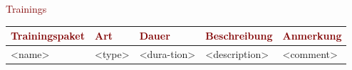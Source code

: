 \begin{center}
\textcolor{Maroon}{\Large Trainings}

{\fontsize{8}{10}\selectfont
\begin{tabular}{p{3cm}p{1cm}p{1cm}p{5cm}p{5cm}}
\textcolor{Maroon}{Trainingspaket} & \textcolor{Maroon}{Art} & \textcolor{Maroon}{Dauer} & \textcolor{Maroon}{Beschreibung} & \textcolor{Maroon}{Anmerkung}\\
\hline
<name> & <type> & <dura-tion> & <description> & <comment>\\
\hline
\end{tabular}
}
\end{center}
